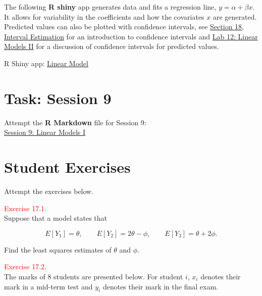 \documentclass[
]{book}
\begin{document}
The following \textbf{R shiny} app generates data and fits a regression line, \(y = \alpha + \beta x\). It allows for variability in the coefficients and how the covariates \(x\) are generated. Predicted values can also be plotted with confidence intervals, see \protect\hyperlink{Interval_Estimation}{Section 18, Interval Estimation} for an introduction to confidence intervals and \protect\hyperlink{Sec_Linear_ANOVA:lab}{Lab 12: Linear Models II} for a discussion of confidence intervals for predicted values.

R Shiny app: \href{https://shiny-new.maths.nottingham.ac.uk/pmzpn/Linear_Model_Intro/}{Linear Model}

\hypertarget{Sec_Linear_LSE:lab}{%
\section*{\texorpdfstring{{\textbf{Task: Session 9}}}{Task: Session 9}}\label{Sec_Linear_LSE:lab}}

Attempt the \textbf{R Markdown} file for Session 9:\\
\href{https://moodle.nottingham.ac.uk/course/view.php?id=134982\#section-2}{Session 9: Linear Models I}

\hypertarget{Sec_Linear_LSE:exer}{%
\section*{\texorpdfstring{{\textbf{Student Exercises}}}{Student Exercises}}\label{Sec_Linear_LSE:exer}}

Attempt the exercises below.

\hypertarget{exer17:1}{}
\textcolor{red}{Exercise 17.1.}\\
Suppose that a model states that

\[ E[Y_1] = \theta, \qquad E[Y_2] = 2 \theta - \phi, \qquad E[Y_3] = \theta + 2 \phi.\]

Find the least squares estimates of \(\theta\) and \(\phi\).

\hfill\break

\leavevmode{}%
\textcolor{red}{Exercise 17.2.}\\

The marks of 8 students are presented below. For student \(i\), \(x_i\) denotes their mark in a mid-term test and \(y_i\) denotes their mark in the final exam.
\end{document}
